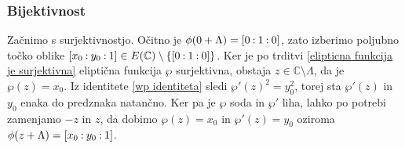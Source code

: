 \documentclass[mat1]{fmfdelo}
\numberwithin{equation}{section}
\newcommand{\C}{\mathbb C}
\newcommand{\CM}{\mathbb C ^*}
\newcommand{\oio}{\pcoor{0: 1 : 0}}
\newcommand{\om}{\omega}
\newcommand{\torus}{\C/\Lambda}
\newcommand{\pcoor}[1]{%
\begingroup\lccode`~=`: \lowercase{\endgroup
\edef~}{\mathbin{\mathchar\the\mathcode`:}\nobreak}%
\left[%
\begingroup
\mathcode`:=\string"8000
#1%
\endgroup
\right]%
}
\newcommand{\tj}{tj.\ }
\theoremstyle{definition}
\begin{document}
\begin{dokaz}


    \subsubsection*{Bijektivnost}
    Začnimo s surjektivnostjo. Očitno je $\phi(0 + \Lambda) = \oio$, zato izberimo poljubno točko oblike $\pcoor{x_0 : y_0 : 1} \in E(\C) \setminus \{\oio\}$. Ker je po trditvi \ref{elipticna funkcija je surjektivna} eliptična funkcija $\wp$ surjektivna, obstaja $z \in \C \setminus \Lambda$, da je $\wp(z) = x_0$. Iz identitete \eqref{wp identiteta} sledi $\wp'(z)^2 = y_0^2$, torej sta $\wp'(z)$ in $y_0$ enaka do predznaka natančno. Ker pa je $\wp$ soda in $\wp'$ liha, lahko po potrebi zamenjamo $-z$ in $z$, da dobimo $\wp(z) = x_0$ in $\wp'(z) = y_0$ oziroma $\phi(z + \Lambda) = \pcoor{x_0 : y_0 : 1}$.


\end{dokaz}
\end{document}
